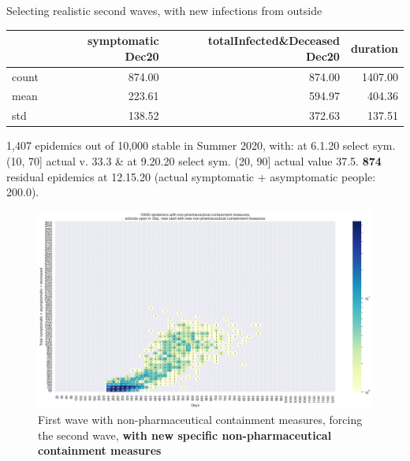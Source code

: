 \documentclass[8pt]{beamer}
\begin{document}
\begin{frame}{Selecting realistic second waves, with new infections from outside}



\begin{table}[H]
\center
\tiny

\begin{tabular}{lrrr}
\toprule
{} &  symptomatic Dec20 &  totalInfected\&Deceased Dec20 &  duration \\
\midrule
count &   874.00 &                     874.00 & 1407.00 \\
mean  &   223.61 &                     594.97 &  404.36 \\
std   &   138.52 &                     372.63 &  137.51 \\
\bottomrule
\end{tabular}

\label{selSpontWave2Contr2Tab}
\end{table}

{\tiny
1,407 epidemics out of 10,000  stable in Summer 2020, with: at 6.1.20 select sym. (10, 70] actual v. 33.3 \& at 9.20.20 select sym. (20, 90] actual value 37.5. \textbf{874} residual epidemics at 12.15.20 (actual symptomatic +  asymptomatic people: 200.0).}


\begin{figure}[H]
\center
\includegraphics[scale=0.19]{10kForceWave2Contr2.png}
\caption{First wave with non-pharmaceutical containment measures, forcing the second wave, \textbf{with new specific non-pharmaceutical containment measures}} 
\label{selForceWave2Contr2}
\end{figure}

\end{frame}
\end{document}
